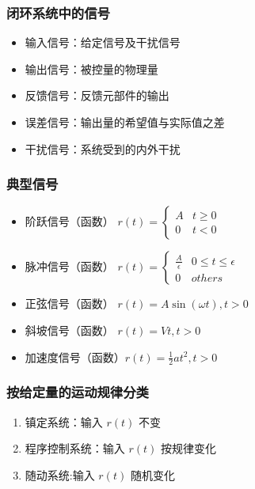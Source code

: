 \documentclass{article}
\begin{document}
\begin{frame}
\frametitle{闭环系统中的信号}
\label{sec-3-1-3}

\begin{itemize}
\item <2->输入信号：给定信号及干扰信号
\item <2->输出信号：被控量的物理量
\item <3->反馈信号：反馈元部件的输出
\end{itemize}
\begin{itemize}
\item <4->误差信号：输出量的希望值与实际值之差
\item <5->干扰信号：系统受到的内外干扰
\end{itemize}
\end{frame}
\begin{frame}
\frametitle{典型信号}
\label{sec-3-1-4}

\begin{itemize}
\item <2->阶跃信号（函数）  $r(t)=\begin{cases} A & t\geq 0 \\ 0 & t < 0 \end{cases}$
\item <3->脉冲信号（函数）  $r(t)=\begin{cases}\frac{A}{\epsilon}  & 0\leq t\leq \epsilon\\ 0 & others\end{cases}$
\item <4->正弦信号（函数）  $r(t)=A\sin(\omega t), t>0$
\item <5->斜坡信号（函数）  $r(t)=Vt  ,     t>0$
\item <6->加速度信号（函数）$r(t)=\frac{1}{2}at^2,  t>0$
\end{itemize}
\end{frame}
\begin{frame}
\frametitle{按给定量的运动规律分类}
\label{sec-3-1-5}

\begin{enumerate}
\item <2->镇定系统：输入 $r(t)$ 不变
\item <3->程序控制系统：输入 $r(t)$ 按规律变化
\item <4->随动系统:输入 $r(t)$ 随机变化
\end{enumerate}
\end{frame}
\end{document}
